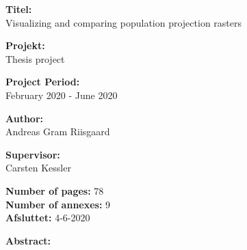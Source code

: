\setcounter{page}{1}


\vspace*{1cm}

\begin{minipage}[t]{0.48\textwidth}
\textbf{Titel:} \\[5pt]\hspace{2ex}
Visualizing and comparing population projection rasters

\vspace*{1cm}

\textbf{Projekt:} \\[5pt]\bigskip\hspace{2ex}
Thesis project

\textbf{Project Period:} \\[5pt]\bigskip\hspace{2ex}
February 2020 - June 2020

\textbf{Author:} \\[5pt]\hspace*{2ex}
Andreas Gram Riisgaard 
\\\bigskip\hspace{2ex}


\textbf{Supervisor:} \\[5pt]\hspace*{2ex}
Carsten Kessler \\\bigskip\hspace{2ex}




\textbf{Number of pages:} 78 \\
\textbf{Number of annexes:} 9 \\ 
\textbf{Afsluttet:} 4-6-2020
 
\end{minipage}
\hfill
\begin{minipage}[t]{0.8\textwidth}%
 \textbf{Abstract:} \\[3pt]
 \fbox{\parbox{8cm}{\bigskip\bigskip}}
\end{minipage}
